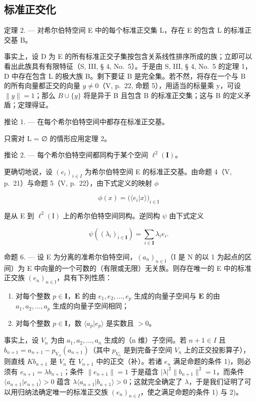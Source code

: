 \subsection{标准正交化}

定理 2. --- 对希尔伯特空间 E 中的每个标准正交集 L，存在 E 的包含 L 的标准正交基 B。

事实上，设 D 为 E 的所有标准正交子集按包含关系线性排序所成的族；立即可以看出此族具有有限特征（S, III, § 4, No.~5）。于是由 S, III, § 4, No.~5 的定理 1，D 中存在包含 L 的极大族 B。剩下要证 B 是完全集。若不然，将存在一个与 B 的所有向量都正交的向量 \(y \neq 0\)（V, p.~22, 命题 5），用适当的标量乘 y，可设 \(\|y\| = 1\)；那么 \(B \cup \{y\}\) 将是异于 B 且包含 B 的标准正交集；这与 B 的定义矛盾；定理得证。

推论 1. --- 在每个希尔伯特空间中都存在标准正交基。

只需对 L = ∅ 的情形应用定理 2。

推论 2. --- 每个希尔伯特空间都同构于某个空间 \(\ell^2 (\mathbf{I})\)。

更确切地说，设 \((e_{i})_{i\in I}\) 为希尔伯特空间 E 的标准正交基。由命题 4（V, p.~21）与命题 5（V, p.~22），由下式定义的映射 \(\phi\)

\[
\phi (x) = \big (\langle e _ {i} | x \rangle \big) _ {i \in \mathrm{I}}\tag{4}
\]

是从 E 到 \(\ell^2 (\mathrm{I})\) 上的希尔伯特空间同构。逆同构 \(\psi\) 由下式定义

\[
\psi ((\lambda_ {i}) _ {i \in \mathbf {I}}) = \sum_ {i \in \mathbf {I}} \lambda_ {i} e _ {i}.\tag{5}
\]

命题 6. --- 设 E 为分离的准希尔伯特空间，\((a_{n})_{n\in\mathbb{I}}\)（I 是 N 的以 1 为起点的区间）为 E 中向量的一个可数的（有限或无限）无关族。则存在唯一的 E 中的标准正交族 \((e_{n})_{n\in\mathbb{I}}\)，具有下列性质：

\begin{enumerate}
\def\labelenumi{\arabic{enumi})}
\item
  对每个整数 \(p \in \mathbf{I}\)，\(\mathbf{E}\) 的由 \(e_1, e_2, \ldots, e_p\) 生成的向量子空间与 \(\mathbf{E}\) 的由 \(a_1, a_2, \ldots, a_p\) 生成的向量子空间相同；
\item
  对每个整数 \(p \in \mathbf{I}\)，数 \(\langle a_p | e_p \rangle\) 是实数且 \(> 0\)。
\end{enumerate}

事实上，设 \(V_{n}\) 为由 \(a_{1}, a_{2}, ..., a_{n}\) 生成的（n 维）子空间。若 \(n + 1 \in I\) 且 \(b_{n+1} = a_{n+1} - p_{\mathrm{V}_{n}}(a_{n+1})\)（其中 \(p_{V_{n}}\) 是到完备子空间 \(V_{n}\) 上的正交投影算子），则直线 \(Kb_{n+1}\) 是 \(V_{n}\) 在 \(V_{n+1}\) 中的正交（补）。若诸 \(e_{n}\) 满足命题的条件 1)，则必须有 \(e_{n+1} = \lambda b_{n+1}\)；条件 \(\|e_{n+1}\| = 1\) 于是蕴含 \(|\lambda|^2 \|b_{n+1}\|^2 = 1\)，而条件 \(\langle a_{n+1}|e_{n+1} \rangle > 0\) 蕴含 \(\lambda \langle a_{n+1}|b_{n+1} \rangle > 0\)；这就完全确定了 \(\lambda\)，于是我们证明了可以用归纳法确定唯一的标准正交族 \((e_n)_{n\in I}\)，使之满足命题的条件 1) 与 2)。

